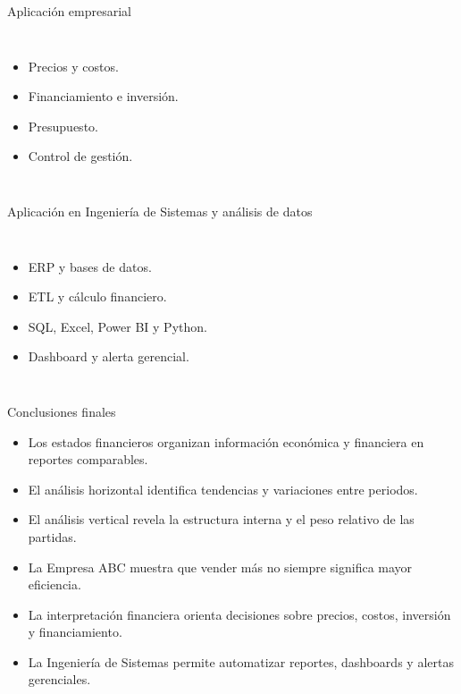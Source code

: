 \begin{frame}{Aplicación empresarial}
  \begin{columns}[T,onlytextwidth]
    \begin{itemize}
      \item Precios y costos.
      \item Financiamiento e inversión.
      \item Presupuesto.
      \item Control de gestión.
    \end{itemize}
  \end{columns}
\end{frame}

\begin{frame}{Aplicación en Ingeniería de Sistemas y análisis de datos}
  \begin{columns}[T,onlytextwidth]
    \begin{itemize}
      \item ERP y bases de datos.
      \item ETL y cálculo financiero.
      \item SQL, Excel, Power BI y Python.
      \item Dashboard y alerta gerencial.
    \end{itemize}
    \flujoERPdashboard
  \end{columns}
\end{frame}

\begin{frame}{Conclusiones finales}
  \footnotesize
  \begin{itemize}
    \item Los estados financieros organizan información económica y financiera en reportes comparables.
    \item El análisis horizontal identifica tendencias y variaciones entre periodos.
    \item El análisis vertical revela la estructura interna y el peso relativo de las partidas.
    \item La Empresa ABC muestra que vender más no siempre significa mayor eficiencia.
    \item La interpretación financiera orienta decisiones sobre precios, costos, inversión y financiamiento.
    \item La Ingeniería de Sistemas permite automatizar reportes, dashboards y alertas gerenciales.
  \end{itemize}
\end{frame}
